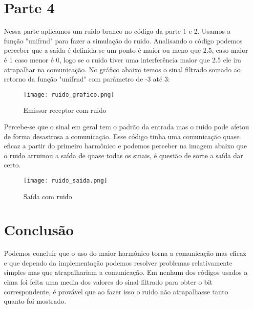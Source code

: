 \documentclass{article}
\begin{document}
    \section{Parte 4}
        Nessa parte aplicamos um ruido branco no código da parte 1 e 2. Usamos a função "unifrnd" para fazer a simulação do ruido. Analisando o código podemos perceber que a saída é definida se um ponto é maior ou meno que 2.5, caso maior é 1 caso menor é 0, logo se o ruido tiver uma interferência maior que 2.5 ele ira atrapalhar na comunicação. No gráfico abaixo temos o sinal filtrado somado ao retorno da função "unifrnd" com parâmetro de -3 até 3:
         \begin{figure}[H]
            \begin{center}
                \texttt{[image: ruido\_grafico.png]}
                \caption{Emissor receptor com ruido}
                \label{fig:ruido_grafico}
            \end{center}
        \end{figure}
        Percebe-se que o sinal em geral tem o padrão da entrada mas o ruido pode afetou de forma desastrosa a comunicação. Esse código tinha uma comunicação quase eficaz a partir do primeiro harmônico e podemos perceber na imagem abaixo que o ruido arruinou a saída de quase todas os sinais, é questão de sorte a saída dar certo.
        \begin{figure}[H]
            \begin{center}
                \texttt{[image: ruido\_saida.png]}
                \caption{Saída com ruido}
                \label{fig:ruido_saida}
            \end{center}
        \end{figure}
    \section{Conclusão}
        Podemos concluir que o uso do maior harmônico torna a comunicação mas eficaz e que dependo da implementação podemos resolver problemas relativamente simples mas que atrapalhariam a comunicação. Em nenhum dos códigos usados a cima foi feita uma media dos valores do sinal filtrado para obter o bit correspondente, é provável que ao fazer isso o ruido não atrapalhasse tanto quanto foi mostrado.
\end{document}
